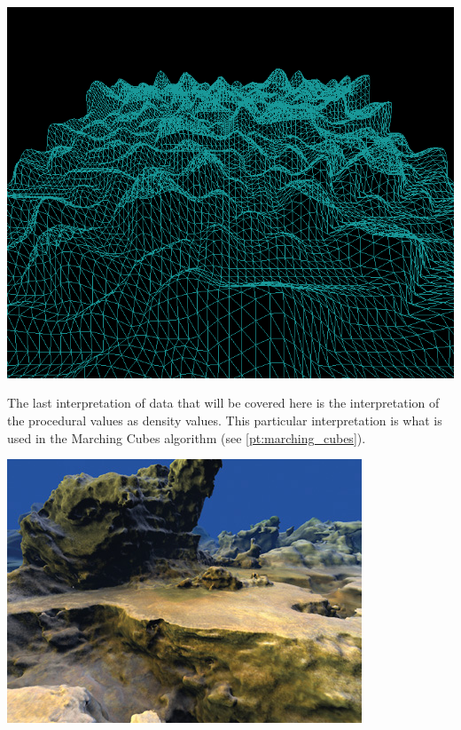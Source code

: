 \documentclass[10pt]{report}
\begin{document}
		\begin{minipage}{\textwidth}
			\centering
			\includegraphics[scale=0.3]{terrain_mesh}
			\label{fig:terrain_mesh}
		\end{minipage}
	
		The last interpretation of data that will be covered here is the interpretation of the procedural values as density values. This particular interpretation is what is used in the Marching Cubes algorithm (see \autoref{pt:marching_cubes}). 
		
		\begin{minipage}{\textwidth}
			\centering
			\includegraphics[scale=1.0]{marching}
			\label{fig:marching}
		\end{minipage}
	
\end{document}
